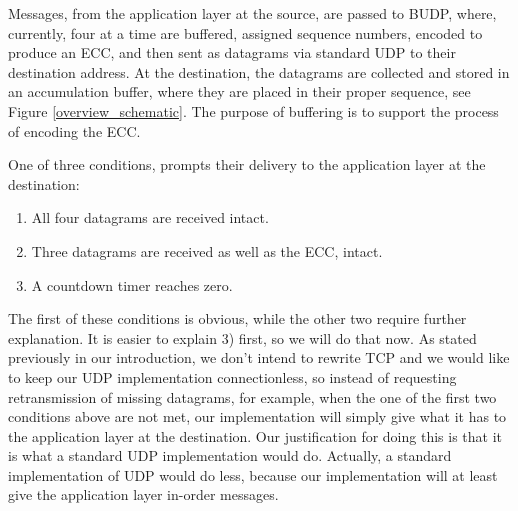 \documentclass[conference]{IEEEtran}
\theoremstyle{definition}
\begin{document}





Messages, from the application layer at the source, are passed to
BUDP, where, currently, four at a time are buffered,
assigned sequence numbers, encoded to produce an ECC,
and then sent as datagrams via standard UDP to their
destination address. At the destination, the datagrams
are collected and stored in an accumulation buffer,
where they are placed in their proper sequence, see
Figure \ref{overview_schematic}.  The purpose of
buffering is to support the process of encoding the ECC.


One of three conditions,
prompts their delivery to the application layer at the
destination:

\begin{enumerate}
 \item All four datagrams are received intact.
 \item Three datagrams are received as well as
       the ECC, intact.
 \item A countdown timer reaches zero.\\
\end{enumerate}

The first of these conditions is obvious, while
the other two require further explanation.  It
is easier to explain 3) first, so we will do
that now.  As stated previously in our introduction,
we don't intend to rewrite TCP and we would like
to keep our UDP implementation connectionless,
so instead of requesting retransmission of
missing datagrams, for example, when the one of
the first two conditions above are not met, our
implementation will simply give what it has to
the application layer at the destination.  Our
justification for doing this is that it is what
a standard UDP implementation would do.  Actually,
a standard implementation of UDP would do less,
because our implementation will at least give the
application layer in-order messages.

\end{document}
